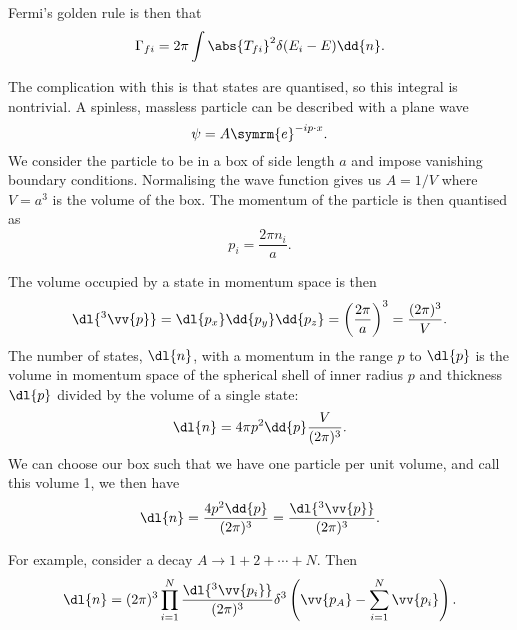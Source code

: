 \documentclass[fleqn]{NotesClass}
\newcommand{\e}{\symrm{e}}
\begin{document}
    Fermi's golden rule is then that
    \begin{equation}
        \Gamma_{fi} = 2\pi \int \abs{T_{fi}}^2 \delta(E_i - E) \dd{n}.
    \end{equation}
    
    The complication with this is that states are quantised, so this integral is nontrivial.
    A spinless, massless particle can be described with a plane wave
    \begin{equation}
        \psi = A\e^{-ip\cdot x}.
    \end{equation}
    We consider the particle to be in a box of side length \(a\) and impose vanishing boundary conditions.
    Normalising the wave function gives us \(A = 1/V\) where \(V = a^3\) is the volume of the box.
    The momentum of the particle is then quantised as
    \begin{equation}
        p_i = \frac{2\pi n_i}{a}.
    \end{equation}
    
    The volume occupied by a state in momentum space is then
    \begin{equation}
        \dl{^3\vv{p}} = \dl{p_x} \dd{p_y}\dd{p_z} = \left( \frac{2\pi}{a} \right)^3 = \frac{(2\pi)^3}{V}.
    \end{equation}
    The number of states, \(\dl{n}\), with a momentum in the range \(p\) to \(\dl{p}\) is the volume in momentum space of the spherical shell of inner radius \(p\) and thickness \(\dl{p}\) divided by the volume of a single state:
    \begin{equation}
        \dl{n} = 4\pi p^2 \dd{p} \frac{V}{(2\pi)^3}.
    \end{equation}
    We can choose our box such that we have one particle per unit volume, and call this volume 1, we then have
    \begin{equation}
        \dl{n} = \frac{4p^2 \dd{p}}{(2\pi)^3} = \frac{\dl{^3\vv{p}}}{(2\pi)^3}.
    \end{equation}
    
    For example, consider a decay \(A \to 1 + 2 + \dotsb + N\).
    Then
    \begin{equation}
        \dl{n} = (2\pi)^3 \prod_{i=1}^{N} \frac{\dl{^3\vv{p_i}}}{(2\pi)^3} \delta^3\left( \vv{p_A} - \sum_{i = 1}^{N} \vv{p_i} \right).
    \end{equation}
    
\end{document}
